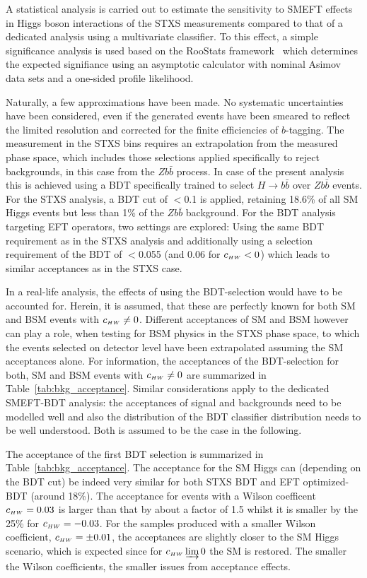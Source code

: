 A statistical analysis is carried out to estimate the sensitivity to SMEFT effects in Higgs boson interactions of the STXS measurements compared to that of a dedicated analysis using a multivariate classifier. To this effect, a simple significance analysis is used based on the {\sc RooStats} framework~\cite{Moneta:2010pm} which determines the expected signifiance using an asymptotic calculator with nominal Asimov data sets and a one-sided profile likelihood. 

Naturally, a few approximations have been made. No systematic uncertainties have been considered, even if the generated events have been smeared to reflect the limited resolution and corrected for the finite efficiencies of $b$-tagging. The measurement in the STXS bins requires an extrapolation from the measured phase space, which includes those selections applied specifically to reject backgrounds, in this case from the $Z b\bar{b}$ process. In case of the present analysis this is achieved using a BDT specifically trained to select $H\to b\bar{b}$ over $Z b\bar{b}$ events. For the STXS analysis, a BDT cut of $<$0.1 is applied, retaining 18.6\% of all SM Higgs events but less than 1\% of the $Z b\bar{b}$ background. For the BDT analysis targeting EFT operators, two settings are explored: Using the same BDT requirement as in the STXS analysis and additionally using a selection requirement of the BDT of $<$0.055 (and 0.06 for $c_{\scriptscriptstyle HW} <0$) which leads to similar acceptances as in the STXS case. 

In a real-life analysis, the effects of using the BDT-selection would have to be accounted for. Herein, it is assumed, that these are perfectly known for both SM and BSM events with $c_{\scriptscriptstyle HW} \neq 0$. Different acceptances of SM and BSM however can play a role, when testing for BSM physics in the STXS phase space, to which the events selected on detector level have been extrapolated assuming the SM acceptances alone. For information, the acceptances of the BDT-selection for both, SM and BSM events with $c_{\scriptscriptstyle HW} \neq 0$ are summarized in Table~\ref{tab:bkg_acceptance}. Similar considerations apply to the dedicated SMEFT-BDT analysis: the acceptances of signal and backgrounds need to be modelled well and also the distribution of the BDT classifier distribution needs to be well understood. Both is assumed to be the case in the following.

The acceptance of the first BDT selection is summarized in Table~\ref{tab:bkg_acceptance}. The acceptance for the SM Higgs can (depending on the BDT cut) be indeed very similar for both STXS BDT and EFT optimized-BDT (around 18\%). The acceptance for events with a Wilson coefficent $c_{\scriptscriptstyle HW}=0.03$ is larger than that by about a factor of 1.5 whilst it is smaller by the 25\% for $c_{\scriptscriptstyle HW}=-0.03$. For the samples produced with a smaller Wilson coefficient, $c_{\scriptscriptstyle HW} = \pm0.01$, the acceptances are slightly closer to the SM Higgs scenario, which is expected since for $c_{\scriptscriptstyle HW} \varinjlim 0$ the SM is restored. The smaller the Wilson coefficients, the smaller issues from acceptance effects. 

